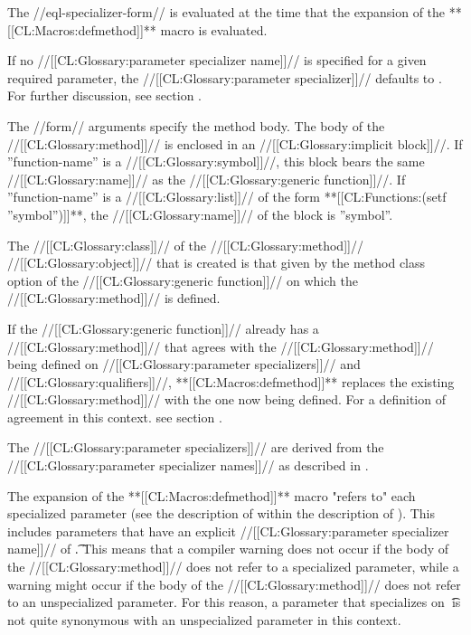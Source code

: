 The //eql-specializer-form// is evaluated at the time that the expansion of the **[[CL:Macros:defmethod]]** macro is evaluated.

If no //[[CL:Glossary:parameter specializer name]]// is specified for a given required parameter, the //[[CL:Glossary:parameter specializer]]// defaults to . For further discussion, see section {\secref\IntroToMethods}.

The //form// arguments specify the method body. The body of the //[[CL:Glossary:method]]// is enclosed in an //[[CL:Glossary:implicit block]]//. If ''function-name'' is a //[[CL:Glossary:symbol]]//, this block bears the same //[[CL:Glossary:name]]// as the //[[CL:Glossary:generic function]]//. If ''function-name'' is a //[[CL:Glossary:list]]// of the form **[[CL:Functions:(setf ''symbol'')]]**, the //[[CL:Glossary:name]]// of the block is ''symbol''.

The //[[CL:Glossary:class]]// of the //[[CL:Glossary:method]]// //[[CL:Glossary:object]]// that is created is that given by the method class option of the //[[CL:Glossary:generic function]]// on which the //[[CL:Glossary:method]]// is defined.

If the //[[CL:Glossary:generic function]]// already has a //[[CL:Glossary:method]]// that agrees with the //[[CL:Glossary:method]]// being defined on //[[CL:Glossary:parameter specializers]]// and //[[CL:Glossary:qualifiers]]//, **[[CL:Macros:defmethod]]** replaces the existing //[[CL:Glossary:method]]// with the one now being defined. For a definition of agreement in this context. see section {\secref\SpecializerQualifierAgreement}.

The //[[CL:Glossary:parameter specializers]]// are derived from the //[[CL:Glossary:parameter specializer names]]// as described in \secref\IntroToMethods.

The expansion of the **[[CL:Macros:defmethod]]** macro "refers to" each specialized parameter (see the description of  within the description of ). This includes parameters that have an explicit //[[CL:Glossary:parameter specializer name]]// of \t. This means that a compiler warning does not occur if the body of the //[[CL:Glossary:method]]// does not refer to a specialized parameter, while a warning might occur if the body of the //[[CL:Glossary:method]]// does not refer to an unspecialized parameter. For this reason, a parameter that specializes on \t\ is not quite synonymous with an unspecialized parameter in this context.


